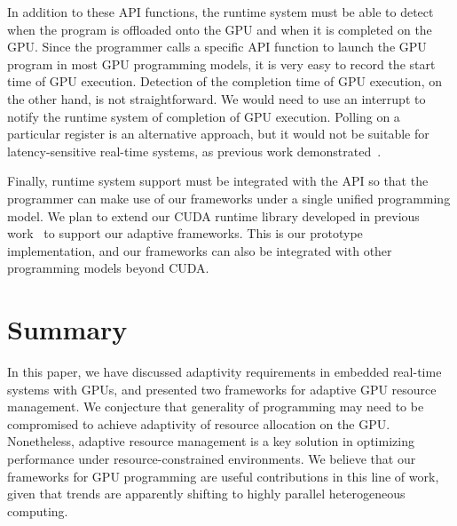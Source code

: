 \documentclass[times, 10pt, twocolumn]{article}
\begin{document}
In addition to these API functions, the runtime system must be able to
detect when the program is offloaded onto the GPU and when it is
completed on the GPU.
Since the programmer calls a specific API function to launch the GPU
program in most GPU programming models, it is very easy to record the
start time of GPU execution.
Detection of the completion time of GPU execution, on the other hand, is
not straightforward.
We would need to use an interrupt to notify the runtime system of
completion of GPU execution.
Polling on a particular register is an alternative approach, but it
would not be suitable for latency-sensitive real-time systems, as
previous work demonstrated~\cite{Kato_ATC11}.

Finally, runtime system support must be integrated with the API so that
the programmer can make use of our frameworks under a single unified
programming model.
We plan to extend our CUDA runtime library developed in previous
work~\cite{Kato_OSPERT11} to support our adaptive frameworks.
This is our prototype implementation, and our frameworks can also be
integrated with other programming models beyond CUDA.

\section{Summary}
\label{sec:summary}

In this paper, we have discussed adaptivity requirements in embedded
real-time systems with GPUs, and presented two frameworks for adaptive
GPU resource management.
We conjecture that generality of programming may need to be compromised
to achieve adaptivity of resource allocation on the GPU.
Nonetheless, adaptive resource management is a key solution in
optimizing performance under resource-constrained environments.
We believe that our frameworks for GPU programming are useful
contributions in this line of work, given that trends are apparently
shifting to highly parallel heterogeneous computing.


{\footnotesize

}
\end{document}
